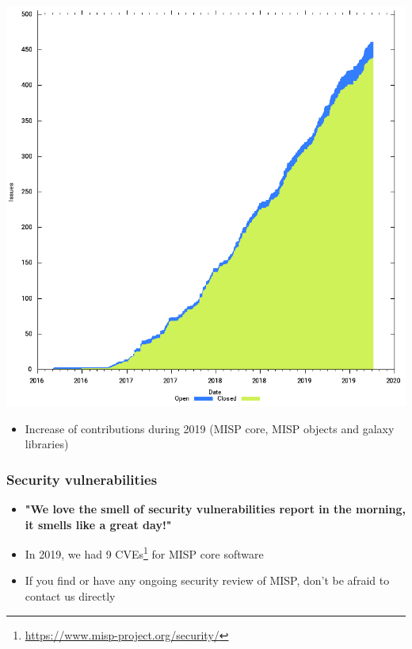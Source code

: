 \begin{frame}
        \includegraphics[scale=0.18]{galaxy-cfd.png}
\begin{itemize}
        \item Increase of contributions during 2019 (MISP core, MISP objects and galaxy libraries)
\end{itemize}
\end{frame}

\begin{frame}
        \frametitle{Security vulnerabilities}
        \begin{itemize}
        \item {\bf "We love the smell of security vulnerabilities report in the morning, it smells like a great day!"}
        \item In 2019, we had 9 CVEs\footnote{\url{https://www.misp-project.org/security/}} for MISP core software
        \item If you find or have any ongoing security review of MISP, don't be afraid to contact us directly
        \end{itemize}
\end{frame}

